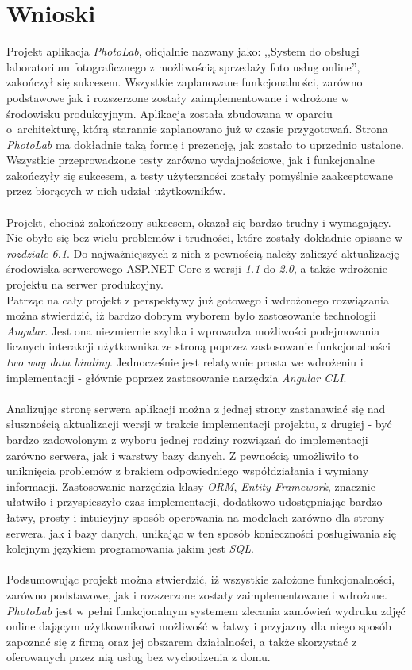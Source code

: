 \section{Wnioski}
\quad Projekt aplikacja \textit{PhotoLab}, oficjalnie nazwany jako: ,,System do obsługi laboratorium fotograficznego z możliwością sprzedaży foto usług online'', zakończył się sukcesem. Wszystkie zaplanowane funkcjonalności, zarówno podstawowe jak i rozszerzone zostały zaimplementowane i wdrożone w środowisku produkcyjnym. Aplikacja została zbudowana w oparciu o~architekturę, którą starannie zaplanowano już w czasie przygotowań. Strona \textit{PhotoLab} ma dokładnie taką formę i prezencję, jak zostało to uprzednio ustalone. Wszystkie przeprowadzone testy zarówno wydajnościowe, jak i funkcjonalne zakończyły się sukcesem, a testy użyteczności zostały pomyślnie zaakceptowane przez biorących w nich udział użytkowników.\\
\\
Projekt, chociaż zakończony sukcesem, okazał się bardzo trudny i wymagający. Nie obyło się bez wielu problemów i trudności, które zostały dokładnie opisane w \textit{rozdziale 6.1}. Do najważniejszych z nich z pewnością należy zaliczyć aktualizację środowiska serwerowego ASP.NET Core z wersji \textit{1.1} do \textit{2.0}, a także wdrożenie projektu na serwer produkcyjny.\\
\newpage
\noindent Patrząc na cały projekt z perspektywy już gotowego i wdrożonego rozwiązania można stwierdzić, iż bardzo dobrym wyborem było zastosowanie technologii \textit{Angular}. Jest ona niezmiernie szybka i wprowadza  możliwości podejmowania licznych interakcji użytkownika ze stroną poprzez zastosowanie funkcjonalności \textit{two way data binding}. Jednocześnie jest relatywnie prosta we wdrożeniu i implementacji - głównie poprzez zastosowanie narzędzia \textit{Angular CLI}.\\
\\
Analizując stronę serwera aplikacji można z jednej strony zastanawiać się nad słusznością aktualizacji wersji w trakcie implementacji projektu, z drugiej - być bardzo zadowolonym z wyboru jednej rodziny rozwiązań do implementacji zarówno serwera, jak i warstwy bazy danych. Z pewnością umożliwiło to uniknięcia problemów z brakiem odpowiedniego współdziałania i wymiany informacji. Zastosowanie narzędzia klasy \textit{ORM}, \textit{Entity Framework}, znacznie ułatwiło i przyspieszyło czas implementacji, dodatkowo udostępniając bardzo łatwy, prosty i intuicyjny sposób operowania na modelach zarówno dla strony serwera. jak i bazy danych, unikając w ten sposób konieczności posługiwania się kolejnym językiem programowania jakim jest \textit{SQL}.\\
\\
Podsumowując projekt można stwierdzić, iż wszystkie założone funkcjonalności, zarówno podstawowe, jak i rozszerzone zostały zaimplementowane i wdrożone. \textit{PhotoLab} jest w pełni funkcjonalnym systemem zlecania zamówień wydruku zdjęć online dającym użytkownikowi możliwość w łatwy i przyjazny dla niego sposób zapoznać się z firmą oraz jej obszarem działalności, a także skorzystać z oferowanych przez nią usług bez wychodzenia z domu.